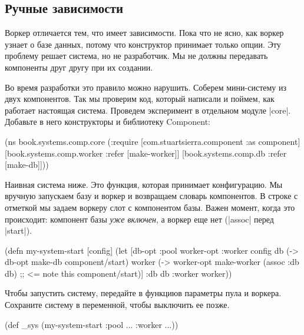 \subsection{Ручные зависимости}

Воркер отличается тем, что имеет зависимости. Пока что не ясно, как воркер
узнает о базе данных, потому что конструктор принимает только опции. Эту
проблему решает система, но не разработчик. Мы не должны передавать компоненты
друг другу при их создании.

Во время разработки это правило можно нарушить. Соберем мини-систему из двух
компонентов. Так мы проверим код, который написали и поймем, как работает
настоящая система. Проведем эксперимент в отдельном модуле
\spverb|core|. Добавьте в него конструкторы и библиотеку Component:

\begin{english}
  \begin{clojure}
(ns book.systems.comp.core
  (:require
   [com.stuartsierra.component :as component]
   [book.systems.comp.worker :refer [make-worker]]
   [book.systems.comp.db :refer [make-db]]))
  \end{clojure}
\end{english}

Наивная система ниже. Это функция, которая принимает конфигурацию. Мы вручную
запускаем базу и воркер и возвращаем словарь компонентов. В строке с отметкой мы
задаем воркеру слот с компонентом базы. Важен момент, когда это происходит:
компонент базы \emph{уже включен}, а воркер еще нет (\spverb|assoc| перед
\spverb|start|).

\begin{english}
  \begin{clojure}
(defn my-system-start
  [config]
  (let [{db-opt :pool
         worker-opt :worker} config
        db (-> db-opt
               make-db
               component/start)
        worker (-> worker-opt
                   make-worker
                   (assoc :db db) ;; <= note this
                   component/start)]
    {:db db :worker worker}))
  \end{clojure}
\end{english}

Чтобы запустить систему, передайте в функциюв параметры пула и
воркера. Сохраните систему в переменной, чтобы выключить ее позже.

\begin{english}
  \begin{clojure}
(def _sys (my-system-start {:pool {...} :worker {...}}))
  \end{clojure}
\end{english}

